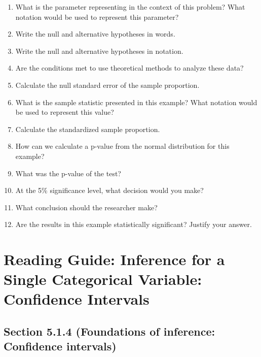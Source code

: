 \documentclass[
]{report}
\newcommand{\rgs}{\vspace{12pt}} %
\begin{document}
\begin{enumerate}
\def\labelenumi{\arabic{enumi}.}
\item
  What is the parameter representing in the context of this problem? What notation would be used to represent this parameter?
  \rgs
  \rgs
\item
  Write the null and alternative hypotheses in words.
  \rgs
  \rgs
\item
  Write the null and alternative hypotheses in notation.
  \rgs
\item
  Are the conditions met to use theoretical methods to analyze these data?
  \rgs
  \rgs
\item
  Calculate the null standard error of the sample proportion.
  \rgs
  \rgs
\item
  What is the sample statistic presented in this example? What notation would be used to represent this value?
  \rgs
\item
  Calculate the standardized sample proportion.
  \rgs
  \rgs
\item
  How can we calculate a p-value from the normal distribution for this example?
  \rgs
  \rgs
\item
  What was the p-value of the test?
  \rgs
\item
  At the 5\% significance level, what decision would you make?
  \rgs
\item
  What conclusion should the researcher make?
  \rgs
  \rgs
\item
  Are the results in this example statistically significant? Justify your answer.
  \rgs
\end{enumerate}

\hypertarget{reading-guide-inference-for-a-single-categorical-variable-confidence-intervals}{%
\section{Reading Guide: Inference for a Single Categorical Variable: Confidence Intervals}\label{reading-guide-inference-for-a-single-categorical-variable-confidence-intervals}}

\hypertarget{section-5.1.4-foundations-of-inference-confidence-intervals}{%
\subsection*{Section 5.1.4 (Foundations of inference: Confidence intervals)}\label{section-5.1.4-foundations-of-inference-confidence-intervals}}
\end{document}
